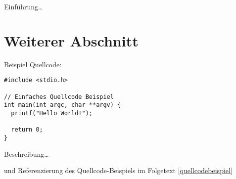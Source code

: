 
Einführung\ldots

\section{Weiterer Abschnitt}

Beispiel Quellcode:

\begin{lstlisting}[style=customCStyle,caption={[Die kurze Beschreibung]Die lange Beschreibung}, label=quellcodebeispiel]
#include <stdio.h>

// Einfaches Quellcode Beispiel
int main(int argc, char **argv) {
  printf("Hello World!");

  return 0;
}
\end{lstlisting}

Beschreibung\ldots

und Referenzierung des Quellcode-Beispiels im Folgetext \autoref{quellcodebeispiel}
